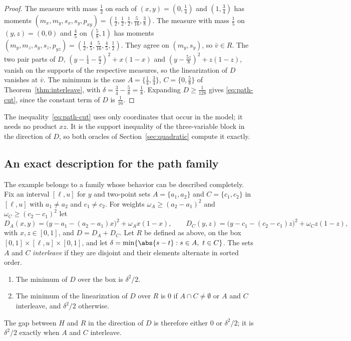 \begin{proof}
The measure with mass $\tfrac12$ on each of $(x,y)=(0,\tfrac14)$ and
$(1,\tfrac34)$ has moments $(m_x,m_y,s_x,s_y,p_{xy})=(\tfrac12,\tfrac12,
\tfrac12,\tfrac5{16},\tfrac38)$. The measure with mass $\tfrac15$ on
$(y,z)=(0,0)$ and $\tfrac45$ on $(\tfrac58,1)$ has moments
$(m_y,m_z,s_y,s_z,p_{yz})=(\tfrac12,\tfrac45,\tfrac5{16},\tfrac45,\tfrac12)$.
They agree on $(m_y,s_y)$, so $\bar v\in R$. The two pair parts of $D$,
$(y-\tfrac14-\tfrac x2)^2+x(1-x)$ and $(y-\tfrac{5z}8)^2+z(1-z)$, vanish on
the supports of the respective measures, so the linearization of $D$
vanishes at $\bar v$. The minimum is the case $A=\{\tfrac14,\tfrac34\}$,
$C=\{0,\tfrac58\}$ of Theorem~\ref{thm:interleave}, with
$\delta=\tfrac34-\tfrac58=\tfrac18$. Expanding $D\ge\tfrac1{128}$ gives
\eqref{eq:path-cut}, since the constant term of $D$ is $\tfrac1{16}$.
\end{proof}

The inequality~\eqref{eq:path-cut} uses only coordinates that occur in the
model; it needs no product $xz$. It is the support inequality of the
three-variable block in the direction of $D$, so both oracles of
Section~\ref{sec:quadratic} compute it exactly.

\subsection{An exact description for the path family}\label{sec:interleave}

The example belongs to a family whose behavior can be described
completely. Fix an interval $[\ell,u]$ for $y$ and two-point sets
$A=\{a_1,a_2\}$ and $C=\{c_1,c_2\}$ in $[\ell,u]$ with $a_1\ne a_2$ and
$c_1\ne c_2$. For weights $\omega_A\ge(a_2-a_1)^2$ and
$\omega_C\ge(c_2-c_1)^2$ let
\begin{equation}\label{eq:family}
D_A(x,y)=\bigl(y-a_1-(a_2-a_1)x\bigr)^2+\omega_Ax(1-x),\qquad
D_C(y,z)=\bigl(y-c_1-(c_2-c_1)z\bigr)^2+\omega_Cz(1-z),
\end{equation}
with $x,z\in[0,1]$, and $D=D_A+D_C$. Let $R$ be defined as above, on the
box $[0,1]\times[\ell,u]\times[0,1]$, and let
$\delta=\min\{\abs{s-t}:s\in A,\ t\in C\}$. The sets $A$ and $C$
\emph{interleave} if they are disjoint and their elements alternate in
sorted order.

\begin{theorem}[Interleaving]\label{thm:interleave}
\begin{enumerate}[label=(\roman*)]
\item The minimum of $D$ over the box is $\delta^2/2$.
\item The minimum of the linearization of $D$ over $R$ is $0$ if
$A\cap C\ne\emptyset$ or $A$ and $C$ interleave, and $\delta^2/2$ otherwise.
\end{enumerate}
The gap between $H$ and $R$ in the direction of $D$ is therefore either
$0$ or $\delta^2/2$; it is $\delta^2/2$ exactly when $A$ and $C$
interleave.
\end{theorem}


